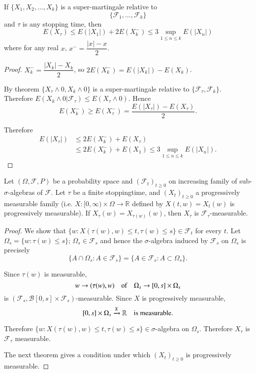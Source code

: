 \begin{corollary}
If $\{X_{1},X_{2},\ldots,X_{k}\}$ is a super-martingale relative to
$$
\{\mathscr{F}_{1},\ldots,\mathscr{F}_{k}\}
$$ 
and $\tau$ is any
stopping time, then
$$
E(X_{\tau})\leq E(|X_{1}|)+2E(X^{-}_{k})\leq 3\sup\limits_{1\leq n\leq
  k}E(|X_{n}|) 
$$
where for any real $x$, $x^{-}=\dfrac{|x|-x}{2}$. 
\end{corollary}

\begin{proof}
$X^{-}_{k}=\dfrac{|X_{k}|-X_{k}}{2}$, so
  $2E(X^{-}_{k})=E(|X_{k}|)-E(X_{k})$. 

By theorem $\{X_{\tau}\wedge 0,X_{k}\wedge 0\}$ is a super-martingale
relative to $\{\mathscr{F}_{\tau},\mathscr{F}_{k}\}$. Therefore
$E(X_{k}\wedge 0|\mathscr{F}_{\tau})\leq E(X_{\tau}\wedge 0)$. Hence
$$
E(X^{-}_{k})\geq E(X^{-}_{\tau})=\frac{E(|X_{\tau}|)-E(X_{\tau})}{2}. 
$$

Therefore
\begin{align*}
E(|X_{\tau}|) &\leq 2E(X^{-}_{k})+E(X_{\tau})\\
&\leq 2E(X^{-}_{k})+E(X_{1})\leq 3\sup\limits_{1\leq n\leq k}E(|X_{n}|).
\end{align*}
\end{proof}

\begin{theorem*}
Let $(\Omega,\mathscr{F},P)$ be a probability space and
$(\mathscr{F}_{t})_{t\geq 0}$ on increasing family of
sub-$\sigma$-algebras of $\mathscr{F}$. Let $\tau$ be a finite
stopping\pageoriginale time, and $(X_{t})_{t\geq 0}$ a progressively
measurable family (i.e. $X:[0,\infty)\times \Omega\to \mathbb{R}$
  defined by $X(t,w)=X_{t}(w)$ is progressively measurable). If
  $X_{\tau}(w)=X_{\tau(w)}(w)$, then $X_{\tau}$ is
  $\mathscr{F}_{\tau}$-measurable. 
\end{theorem*}

\begin{proof}
We show that $\{w:X(\tau(w),w)\leq t, \tau(w)\leq s\}\in
\mathscr{F}_{t}$ for every $t$. Let $\Omega_{s}=\{w:\tau(w)\leq s\}$;
$\Omega_{s}\in \mathscr{F}_{s}$ and hence the $\sigma$-algebra induced
by $\mathscr{F}_{s}$ on $\Omega_{s}$ is precisely
$$
\{A\cap \Omega_{s}:A\in \mathscr{F}_{s}\}=\{A\in
\mathscr{F}_{s}:A\subset \Omega_{s}\}.
$$

Since $\tau(w)$ is measurable,
$$
w\to (\tau(w),w)\quad\text{of}\quad \Omega_{s}\to [0,s]\times \Omega_{s}
$$
is $(\mathscr{F}_{s},\mathscr{B}[0,s]\times
\mathscr{F}_{s})$-measurable. Since $X$ is progressively measurable,
$$
[0,s]\times \Omega_{s}\xrightarrow{X}\mathbb{R}\quad \text{is
  measurable.}
$$

Therefore $\{w:X(\tau(w),w)\leq t,\tau(w)\leq s\}\in \sigma$-algebra
on $\Omega_{s}$. Therefore $X_{\tau}$ is $\mathscr{F}_{\tau}$
measurable.

The next theorem gives a condition under which $(X_{t})_{t\geq 0}$ is
progressively measurable.
\end{proof}

